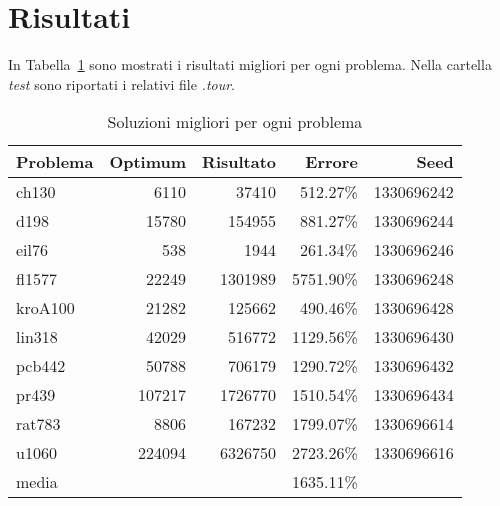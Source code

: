 \chapter*{Risultati}
\label{cha_risultati}

In Tabella~\ref{tab_migliori} sono mostrati i risultati migliori per ogni problema. Nella cartella \emph{test} sono riportati i relativi file \emph{.tour}.
\begin{table}[htb]
  \caption{Soluzioni migliori per ogni problema}
  \label{tab_migliori}
  \centering
\begin{tabular}{lrrrr}
  \toprule
  Problema		&	Optimum		&	Risultato	&	Errore		&	Seed		\\
  \midrule
  ch130			&	6110		&	37410		&	512.27\%	&	1330696242	\\
  d198			&	15780		&	154955		&	881.27\%	&	1330696244	\\
  eil76			&	538		&	1944		&	261.34\%	&	1330696246	\\
  fl1577		&	22249		&	1301989		&	5751.90\%	&	1330696248	\\
  kroA100		&	21282		&	125662		&	490.46\%	&	1330696428	\\
  lin318		&	42029		&	516772		&	1129.56\%	&	1330696430	\\
  pcb442		&	50788		&	706179		&	1290.72\%	&	1330696432	\\
  pr439			&	107217		&	1726770		&	1510.54\%	&	1330696434	\\
  rat783		&	8806		&	167232		&	1799.07\%	&	1330696614	\\
  u1060			&	224094		&	6326750		&	2723.26\%	&	1330696616	\\
  \midrule
  media			&			&			&	1635.11\% 	&			\\
  \bottomrule
\end{tabular}
\end{table}
